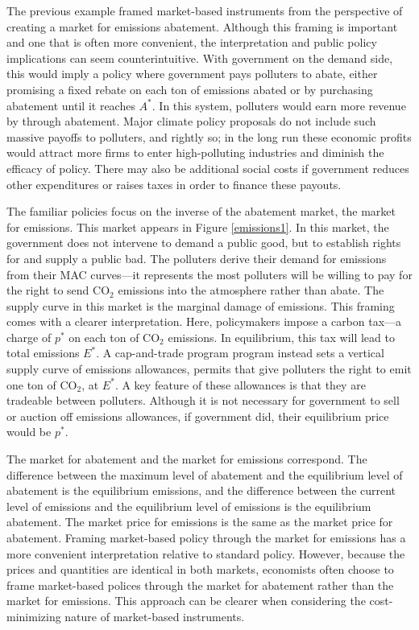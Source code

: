 The previous example framed market-based instruments from the perspective of creating a market for emissions abatement. 
Although this framing is important and one that is often more convenient, the interpretation and public policy implications can seem counterintuitive. With government on the demand side, this would imply a policy where government pays polluters to abate, either promising a fixed rebate on each ton of emissions abated or by purchasing abatement until it reaches $A^*$. In this system, polluters would earn more revenue by through abatement. Major climate policy proposals do not include such massive payoffs to polluters, and rightly so; in the long run these economic profits would attract more firms to enter high-polluting industries and diminish the efficacy of policy. There may also be additional social costs if government reduces other expenditures or raises taxes in order to finance these payouts. 

The familiar policies focus on the inverse of the abatement market, the market for emissions. This market appears in Figure \ref{emissions1}. In this market, the government does not intervene to demand a public good, but to establish rights for and supply a public bad. The polluters derive their demand for emissions from their MAC curves---it represents the most polluters will be willing to pay for the right to send CO$_2$ emissions into the atmosphere rather than abate. The supply curve in this market is the marginal damage of emissions. This framing comes with a clearer interpretation. Here, policymakers impose a carbon tax---a charge of $p^*$ on each ton of CO$_2$ emissions. In equilibrium, this tax will lead to total emissions $E^*$. A cap-and-trade program program instead sets a vertical supply curve of emissions allowances, permits that give polluters the right to emit one ton of CO$_2$, at $E^*$. A key feature of these allowances is that they are tradeable between polluters. Although it is not necessary for government to sell or auction off emissions allowances, if government did, their equilibrium price would be $p^*$. 

The market for abatement and the market for emissions correspond. The difference between the maximum level of abatement and the equilibrium level of abatement is the equilibrium emissions, and the difference between the current level of emissions and the equilibrium level of emissions is the equilibrium abatement. The market price for emissions is the same as the market price for abatement. Framing market-based policy through the market for emissions has a more convenient interpretation relative to standard policy. However, because the prices and quantities are identical in both markets, economists often choose to frame market-based polices through the market for abatement rather than the market for emissions. This approach can be clearer when considering the cost-minimizing nature of market-based instruments.

